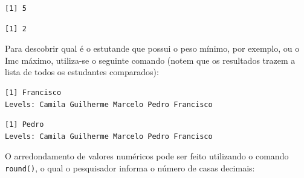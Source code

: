 \documentclass[12pt,brazil,]{book}
\newenvironment{Shaded}{\begin{snugshade}}{\end{snugshade}}
\newcommand{\CommentTok}[1]{\textcolor[rgb]{0.56,0.35,0.01}{\textit{#1}}}
\newcommand{\DecValTok}[1]{\textcolor[rgb]{0.00,0.00,0.81}{#1}}
\newcommand{\KeywordTok}[1]{\textcolor[rgb]{0.13,0.29,0.53}{\textbf{#1}}}
\newcommand{\NormalTok}[1]{#1}
\newcommand{\OperatorTok}[1]{\textcolor[rgb]{0.81,0.36,0.00}{\textbf{#1}}}
\begin{document}
\begin{verbatim}
[1] 5
\end{verbatim}

\begin{Shaded}
\end{Shaded}

\begin{verbatim}
[1] 2
\end{verbatim}

Para descobrir qual é o estutande que possui o peso mínimo, por exemplo,
ou o Imc máximo, utiliza-se o seguinte comando (notem que os resultados
trazem a lista de todos os estudantes comparados):

\begin{Shaded}
\end{Shaded}

\begin{verbatim}
[1] Francisco
Levels: Camila Guilherme Marcelo Pedro Francisco
\end{verbatim}

\begin{Shaded}
\end{Shaded}

\begin{verbatim}
[1] Pedro
Levels: Camila Guilherme Marcelo Pedro Francisco
\end{verbatim}

O arredondamento de valores numéricos pode ser feito utilizando o
comando \texttt{round()}, o qual o pesquisador informa o número de casas
decimais:

\begin{Shaded}
\end{Shaded}
\end{document}
